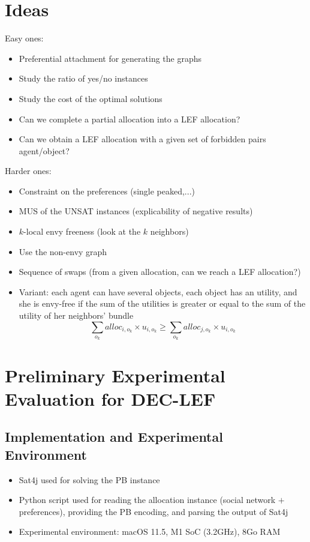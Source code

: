 \documentclass{article}
\begin{document}
\section{Ideas}
Easy ones:
\begin{itemize}
	\item Preferential attachment for generating the graphs
	\item Study the ratio of yes/no instances
	\item Study the cost of the optimal solutions
	\item Can we complete a partial allocation into a LEF allocation?
	\item Can we obtain a LEF allocation with a given set of forbidden pairs agent/object?
\end{itemize}

Harder ones:
\begin{itemize}
	\item Constraint on the preferences (single peaked,...)
	\item MUS of the UNSAT instances (explicability of negative results)
	\item $k$-local envy freeness (look at the $k$ neighbors)
	\item Use the non-envy graph
	\item Sequence of swaps (from a given allocation, can we reach a LEF allocation?)
	\item Variant: each agent can have several objects, each object has an utility, and she is envy-free if the sum of the utilities is greater or equal to the sum of the utility of her neighbors' bundle
	\[
	\sum_{o_k} alloc_{i,o_k} \times u_{i,o_k} \geq \sum_{o_k} alloc_{j,o_k} \times u_{i,o_k}
	\]
\end{itemize}

\appendix

\section{Preliminary Experimental Evaluation for DEC-LEF}\label{section:prelim-expe-dec-lef}
\subsection{Implementation and Experimental Environment}
\begin{itemize}
	\item Sat4j \cite{BerreP10} used for solving the PB instance
	\item Python script used for reading the allocation instance (social network $+$ preferences), providing the PB encoding, and parsing the output of Sat4j
	\item Experimental environment: macOS 11.5, M1 SoC (3.2GHz), 8Go RAM
\end{itemize}
\end{document}
